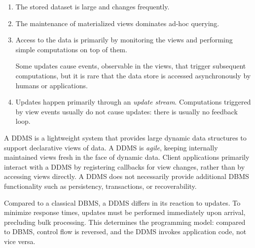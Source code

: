 \begin{enumerate}
\item
The stored dataset is large and changes frequently.

\item 
The
maintenance of materialized views dominates ad-hoc querying.

\item
Access to the data is primarily by monitoring the views and performing
simple computations on top of them.

%
%

Some updates cause events, observable in the views, that trigger subsequent
computations, but it is rare that the data store is accessed asynchronously by
humans or applications.

\item
Updates happen primarily through an {\em update stream}\/. Computations
triggered by view events usually do not cause updates: there is usually no
feedback loop.

\end{enumerate}

\noindent A DDMS is a lightweight system that provides large dynamic data
structures to support declarative views of data. A DDMS is \textit{agile},
keeping internally maintained views fresh in the face of dynamic data.  Client
applications primarily interact with a DDMS by registering callbacks for view
changes, rather than by accessing views directly. A DDMS does not necessarily
provide additional DBMS functionality such as persistency, transactions, or
recoverability.





Compared to a classical DBMS, a DDMS differs in its reaction to updates.  To
minimize response times, updates must be performed immediately upon arrival,
precluding bulk processing. This determines the programming model: compared to
DBMS, control flow is reversed, and the DDMS invokes application code, not vice
versa.



